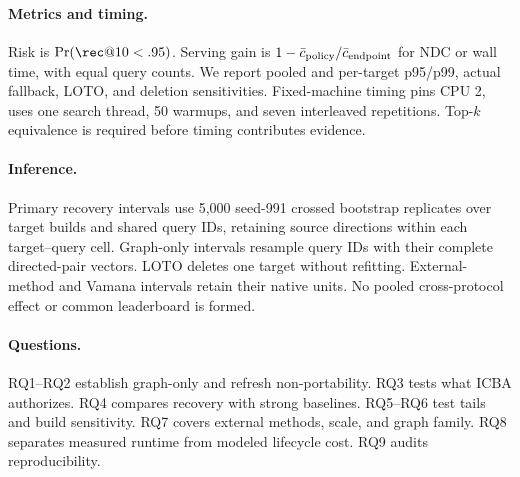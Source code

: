 \paragraph{Metrics and timing.}
Risk is $\Pr(\rec@10<.95)$. Serving gain is $1-\bar c_{\rm policy}/\bar c_{\rm endpoint}$ for NDC or wall time, with equal query counts. We report pooled and per-target p95/p99, actual fallback, LOTO, and deletion sensitivities. Fixed-machine timing pins CPU 2, uses one search thread, 50 warmups, and seven interleaved repetitions. Top-$k$ equivalence is required before timing contributes evidence.

\paragraph{Inference.}
Primary recovery intervals use 5,000 seed-991 crossed bootstrap replicates over target builds and shared query IDs, retaining source directions within each target--query cell. Graph-only intervals resample query IDs with their complete directed-pair vectors. LOTO deletes one target without refitting. External-method and Vamana intervals retain their native units. No pooled cross-protocol effect or common leaderboard is formed.

\paragraph{Questions.}
RQ1--RQ2 establish graph-only and refresh non-portability. RQ3 tests what ICBA authorizes. RQ4 compares recovery with strong baselines. RQ5--RQ6 test tails and build sensitivity. RQ7 covers external methods, scale, and graph family. RQ8 separates measured runtime from modeled lifecycle cost. RQ9 audits reproducibility.
